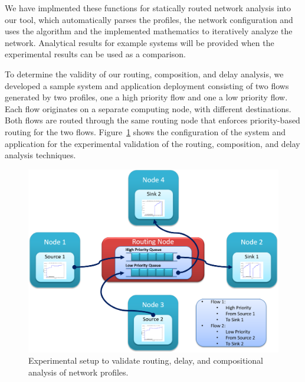We have implmented these functions for statically routed network
analysis into our tool, which automatically parses the profiles, the
network configuration and uses the algorithm and the implemented
mathematics to iteratively analyze the network.  Analytical results
for example systems will be provided when the experimental results can
be used as a comparison.

To determine the validity of our routing, composition, and delay
analysis, we developed a sample system and application deployment
consisting of two flows generated by two profiles, one a high priority
flow and one a low priority flow.  Each flow originates on a separate
computing node, with different destinations.  Both flows are routed
through the same routing node that enforces priority-based routing for
the two flows.  Figure~\ref{fig:routing_example} shows the
configuration of the system and application for the experimental
validation of the routing, composition, and delay analysis techniques.

\begin{figure}[ht!]
  \centering
  \includegraphics[width=\textwidth]{../doc/src/images/results/routing_example.png}
  \caption{Experimental setup to validate routing, delay, and
    compositional analysis of network profiles.}
  \label{fig:routing_example}
\end{figure}

